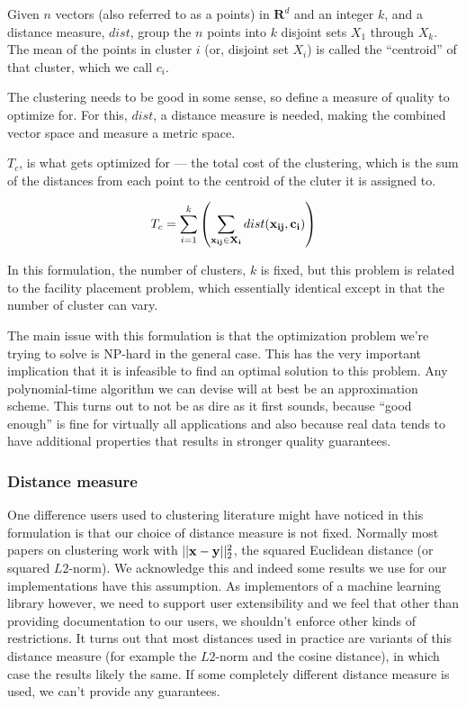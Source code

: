 \documentclass{article}
\begin{document}
Given $n$ vectors (also referred to as a points) in $\textbf{R}^d$ and an
integer $k$, and a distance measure, $dist$, group the $n$ points
into $k$ disjoint sets $X_1$ through $X_k$. The mean of
the points in cluster $i$ (or, disjoint set $X_i$) is called the ``centroid''
of that cluster, which we call $c_i$.

The clustering needs to be good in some sense, so define a measure of
quality to optimize for. For this, $dist$, a distance measure is needed, making the combined vector space and measure a metric space.

$T_c$, is what gets optimized for --- the total cost of the clustering, which is the sum of the distances
from each point to the centroid of the cluter it is assigned to.

\begin{eqnarray}
    T_c = \sum_{i = 1}^{k} \left( \sum_{\bf x_{ij} \in X_i} dist({\bf x_{ij}},
    {\bf c_i})
    \right)
\end{eqnarray}

In this formulation, the number of clusters, $k$ is fixed, but this problem is
related to the facility placement problem, which essentially identical except
in that the number of cluster can vary.

The main issue with this formulation is that the optimization problem we're
trying to solve is NP-hard in the general case.
This has the very important implication that it is infeasible to find an
optimal solution to this problem. Any polynomial-time algorithm we can devise
will at best be an approximation scheme.
This turns out to not be as dire as it first sounds, because ``good enough'' is
fine for virtually all applications and also because real data tends to have
additional properties that results in stronger quality guarantees.

\subsubsection{Distance measure}
One difference users used to clustering literature might have noticed in this
formulation is that our
choice of distance measure is not fixed. Normally most papers on clustering
work with $||{\bf x - y}||_2^2$, the squared Euclidean distance (or squared
$L2$-norm). We acknowledge this and indeed some results we use for our
implementations have this assumption. As implementors of a machine learning
library however, we need to support user extensibility and we feel that other
than providing documentation to our users, we shouldn't enforce other kinds of
restrictions. It turns out that most distances used in practice
are variants of this distance measure (for example the $L2$-norm and the cosine
distance), in which case the results likely the same. If some completely
different distance measure is used, we can't provide any guarantees.
\end{document}
